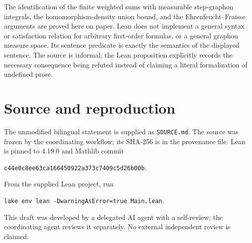 \documentclass[11pt]{article}
\begin{document}
The identification of the finite weighted sums with measurable
step-graphon integrals, the homomorphism-density union bound, and the
Ehrenfeucht--Fraisse arguments are proved here on paper. Lean does not
implement a general syntax or satisfaction relation for arbitrary
first-order formulas, or a general graphon measure space. Its sentence
predicate is exactly the semantics of the displayed sentence. The source
is informal; the Lean proposition explicitly records the necessary
consequence being refuted instead of claiming a literal formalization of
undefined prose.

\section*{Source and reproduction}
The unmodified bilingual statement is supplied as \texttt{SOURCE.md}.
The source was frozen by the coordinating workflow; its SHA-256 is in the
provenance file. Lean is pinned to 4.19.0 and Mathlib commit
\begin{center}\texttt{c44e0c8ee63ca166450922a373c7409c5d26b00b}.\end{center}
From the supplied Lean project, run
\begin{center}\texttt{lake env lean -DwarningAsError=true Main.lean}.\end{center}
This draft was developed by a delegated AI agent with a self-review;
the coordinating agent reviews it separately. No external independent
review is claimed.
\end{document}
